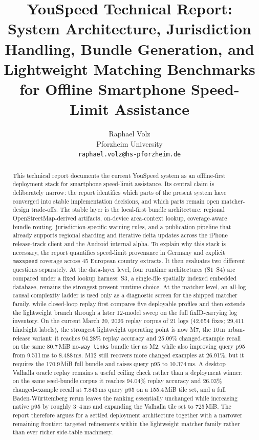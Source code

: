 \documentclass{article}
\title{YouSpeed Technical Report: System Architecture, Jurisdiction Handling, Bundle Generation, and Lightweight Matching Benchmarks for Offline Smartphone Speed-Limit Assistance}
\author{
  Raphael Volz \\
  Pforzheim University \\
  \texttt{raphael.volz@hs-pforzheim.de}
}
\begin{document}
\maketitle

\begin{abstract}
This technical report documents the current YouSpeed system as an offline-first deployment stack for smartphone speed-limit assistance. Its central claim is deliberately narrow: the report identifies which parts of the present system have converged into stable implementation decisions, and which parts remain open matcher-design trade-offs. The stable layer is the local-first bundle architecture: regional OpenStreetMap-derived artifacts, on-device area-context lookup, coverage-aware bundle routing, jurisdiction-specific warning rules, and a publication pipeline that already supports regional sharding and iterative delta updates across the iPhone release-track client and the Android internal alpha. To explain why this stack is necessary, the report quantifies speed-limit provenance in Germany and explicit \texttt{maxspeed} coverage across 45 European country extracts. It then evaluates two different questions separately. At the data-layer level, four runtime architectures (S1--S4) are compared under a fixed lookup harness; S3, a single-file spatially indexed embedded database, remains the strongest present runtime choice. At the matcher level, an all-log causal complexity ladder is used only as a diagnostic screen for the shipped matcher family, while closed-loop replay first compares five deployable profiles and then extends the lightweight branch through a later 12-model sweep on the full fixID-carrying log inventory. On the current March 20, 2026 replay corpus of 21 logs (42{,}654 fixes; 29{,}411 hindsight labels), the strongest lightweight operating point is now M7, the 10\,m urban-release variant: it reaches 94.28\% replay accuracy and 25.09\% changed-example recall on the same 80.7\,MiB no-\texttt{way\_links} bundle tier as M2, while also improving query p95 from 9.511\,ms to 8.488\,ms. M12 still recovers more changed examples at 26.91\%, but it requires the 170.9\,MiB full bundle and raises query p95 to 10.374\,ms. A desktop Valhalla oracle replay remains a useful ceiling check rather than a deployment winner: on the same seed-bundle corpus it reaches 94.04\% replay accuracy and 26.03\% changed-example recall at 7.843\,ms query p95 on a 155.4\,MiB tile set, and a full Baden-W\"urttemberg rerun leaves the ranking essentially unchanged while increasing native p95 by roughly 3--4\,ms and expanding the Valhalla tile set to 725\,MiB. The report therefore argues for a settled deployment architecture together with a narrower remaining frontier: targeted refinements within the lightweight matcher family rather than ever richer side-table machinery.
\end{abstract}
\end{document}
